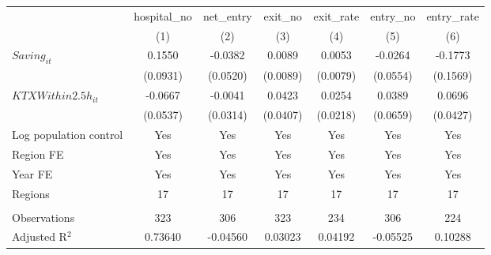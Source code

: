 \begingroup
\centering
\begin{tabular}{lcccccc}
   \toprule
                          & hospital\_no  & net\_entry  & exit\_no  & exit\_rate  & entry\_no  & entry\_rate \\    
                          & (1)           & (2)         & (3)       & (4)         & (5)        & (6)\\  
   \midrule 
   $Saving_{it}$          & 0.1550        & -0.0382     & 0.0089    & 0.0053      & -0.0264    & -0.1773\\   
                          & (0.0931)      & (0.0520)    & (0.0089)  & (0.0079)    & (0.0554)   & (0.1569)\\   
   $KTXWithin2.5h_{it}$   & -0.0667       & -0.0041     & 0.0423    & 0.0254      & 0.0389     & 0.0696\\   
                          & (0.0537)      & (0.0314)    & (0.0407)  & (0.0218)    & (0.0659)   & (0.0427)\\   
   Log population control & Yes           & Yes         & Yes       & Yes         & Yes        & Yes\\  
   Region FE              & Yes           & Yes         & Yes       & Yes         & Yes        & Yes\\  
   Year FE                & Yes           & Yes         & Yes       & Yes         & Yes        & Yes\\  
   Regions                & 17            & 17          & 17        & 17          & 17         & 17\\  
    \\
   Observations           & 323           & 306         & 323       & 234         & 306        & 224\\  
   Adjusted R$^2$         & 0.73640       & -0.04560    & 0.03023   & 0.04192     & -0.05525   & 0.10288\\  
   \bottomrule
\end{tabular}
\par\endgroup
